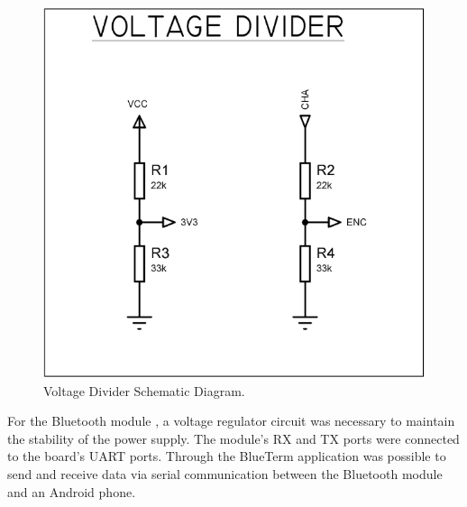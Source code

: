 \documentclass[journal]{IEEEtran}
\begin{document}
\begin{figure}[!ht]%
  \includegraphics[scale=0.57]{voltageDivider.png}
  \centering
  \caption{Voltage Divider Schematic Diagram.}
\end{figure}


For the Bluetooth module \cite{IEEEhowto:bluetooth}, a voltage regulator circuit was necessary to maintain the stability of the power supply. The module’s RX and TX  ports were connected to the board’s UART ports. Through the BlueTerm \cite{IEEEhowto:blueterm} application was possible to send and receive data via serial communication between the Bluetooth module and an Android phone.
\end{document}
